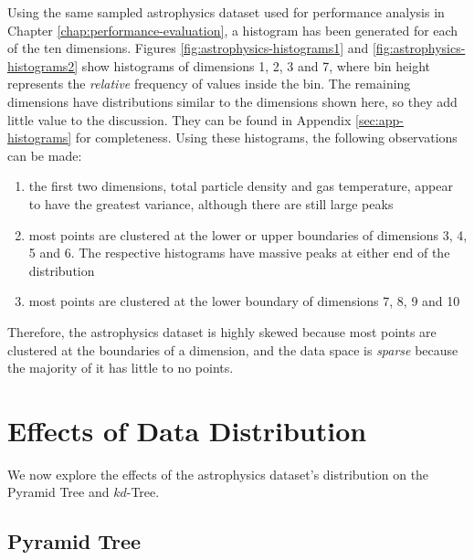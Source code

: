 Using the same sampled astrophysics dataset used for performance analysis in Chapter \ref{chap:performance-evaluation}, a histogram has been generated for each of the ten dimensions. Figures \ref{fig:astrophysics-histograms1} and \ref{fig:astrophysics-histograms2} show histograms of dimensions 1, 2, 3 and 7, where bin height represents the \textit{relative} frequency of values inside the bin. The remaining dimensions have distributions similar to the dimensions shown here, so they add little value to the discussion. They can be found in Appendix \ref{sec:app-histograms} for completeness. Using these histograms, the following observations can be made:

\vspace{20pt}

\begin{enumerate}
	\item the first two dimensions, total particle density and gas temperature, appear to have the greatest variance, although there are still large peaks
	\item most points are clustered at the lower or upper boundaries of dimensions 3, 4, 5 and 6. The respective histograms have massive peaks at either end of the distribution
	\item most points are clustered at the lower boundary of dimensions 7, 8, 9 and 10
\end{enumerate}
Therefore, the astrophysics dataset is highly skewed because most points are clustered at the boundaries of a dimension, and the data space is \textit{sparse} because the majority of it has little to no points.

\section{Effects of Data Distribution}

We now explore the effects of the astrophysics dataset's distribution on the Pyramid Tree and $kd$-Tree.

\subsection{Pyramid Tree}


